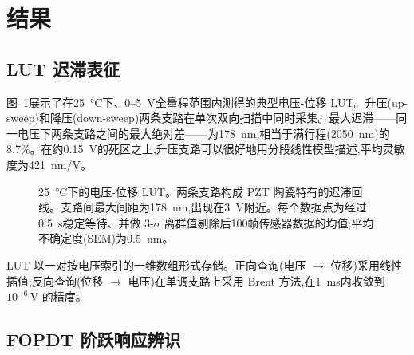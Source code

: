 \documentclass[fleqn,10pt]{wlscirep}
\begin{document}
\section*{结果}

\subsection*{LUT 迟滞表征}

图~\ref{fig:lut}展示了在\SI{25}{\celsius}下、0--\SI{5}{V}全量程范围内测得的典型电压-位移 LUT。升压(up-sweep)和降压(down-sweep)两条支路在单次双向扫描中同时采集。最大迟滞——同一电压下两条支路之间的最大绝对差——为\SI{178}{nm},相当于满行程(\SI{2050}{nm})的8.7\%。在约\SI{0.15}{V}的死区之上,升压支路可以很好地用分段线性模型描述,平均灵敏度为\SI{421}{nm/V}。

\begin{figure}[ht]
    \centering
    \caption{\SI{25}{\celsius}下的电压-位移 LUT。两条支路构成 PZT 陶瓷特有的迟滞回线。支路间最大间距为\SI{178}{nm},出现在\SI{3}{V}附近。每个数据点为经过\SI{0.5}{s}稳定等待、并做 3-$\sigma$ 离群值剔除后100帧传感器数据的均值;平均不确定度(SEM)为\SI{0.5}{nm}。}
    \label{fig:lut}
\end{figure}

LUT 以一对按电压索引的一维数组形式存储。正向查询(电压 $\to$ 位移)采用线性插值;反向查询(位移 $\to$ 电压)在单调支路上采用 Brent 方法,在\SI{1}{ms}内收敛到 $10^{-6}$\,V 的精度。

\subsection*{FOPDT 阶跃响应辨识}
\end{document}
